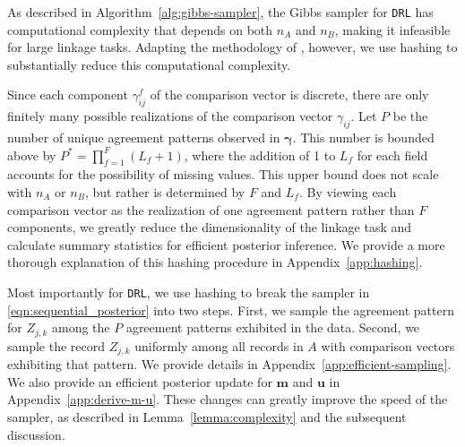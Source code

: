 \documentclass[12pt,letterpaper]{article}
\newcommand{\1}[1]{\mathbb{I}\!\left[#1\right]} %
\begin{document}
As described in Algorithm~\ref{alg:gibbs-sampler}, the Gibbs sampler for \texttt{DRL} has computational complexity that depends on both $n_A$ and $n_B$, making it infeasible for large linkage tasks. Adapting the methodology of \cite{kundinger_2023}, however, we use hashing to substantially reduce this computational complexity. 

Since each component $\gamma_{ij}^f$ of the comparison vector is discrete, there are only finitely many possible realizations of the comparison vector $\gamma_{ij}$. Let $P$ be the number of unique agreement patterns observed in $\bm{\gamma}$. This number is bounded above by $P^{*} =  \prod_{f=1}^F (L_f + 1)$, where the addition of 1 to $L_f$ for each field accounts for the possibility of missing values. This upper bound does not scale with $n_A$ or $n_B$, but rather is determined by $F$ and $L_f$. By viewing each comparison vector as the realization of one agreement pattern rather than $F$ components, we greatly reduce the dimensionality of the linkage task and calculate summary statistics for efficient posterior inference.  We provide a more thorough explanation of this hashing procedure in  Appendix~\ref{app:hashing}. 

Most importantly for \texttt{DRL}, we use hashing to break the sampler in \eqref{eqn:sequential_posterior} into two steps. First, we sample the agreement pattern for $Z_{j,k}$ among the $P$ agreement patterns exhibited in the data. Second, we sample the record $Z_{j,k}$ uniformly among all records in $A$ with comparison vectors exhibiting that pattern. We provide details in  Appendix~\ref{app:efficient-sampling}. We also provide an efficient posterior update for $\bm{m}$ and $\bm{u}$ in Appendix~\ref{app:derive-m-u}. These changes can greatly improve the speed of the sampler, as described in Lemma~\ref{lemma:complexity} and the subsequent discussion.
\end{document}
